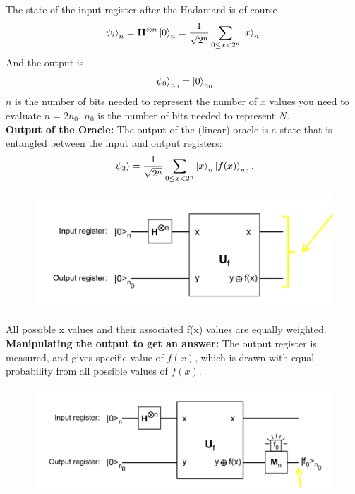 \documentclass{book}
\theoremstyle{definition}
\newcommand{\f}[2]{\frac{#1}{#2}}
\newcommand{\had}{\mathbf{H}}
\begin{document}
The state of the input register after the Hadamard is of course
\begin{align}
\ket{\psi_i}_n = \had^{\otimes n} \ket{0}_n = \f{1}{\sqrt{2^n}}\sum_{0 \leq x < 2^n} \ket{x}_n.
\end{align}
And the output is 
\begin{align}
\ket{\psi_0}_{n_0} = \ket{0}_{n_0}
\end{align}
$n$ is the number of bits needed to represent the
number of $x$ values you need to evaluate $n = 2n_0$. $n_0$ is the number of bits needed to represent $N$. \\


\noindent \textbf{Output of the Oracle:} The output of the (linear) oracle is a state that is entangled between the
input and output registers:
\begin{align}
\ket{\psi_2} = \f{1}{\sqrt{2^n}} \sum_{0 \leq x < 2^n} \ket{x}_n \ket{f(x)}_{n_0}.
\end{align}
\begin{figure}[!htb]
	\centering
	\includegraphics[scale=0.5]{shor2}
\end{figure}
All possible x values and their associated f(x) values
are equally weighted. \\




\noindent \textbf{Manipulating the output to get an answer:} The output register is measured, and gives specific value of $f(x)$, which
is drawn with equal probability from all possible values of $f(x)$. 
\begin{figure}[!htb]
	\centering
	\includegraphics[scale=0.14]{shor3}
\end{figure}
\end{document}
